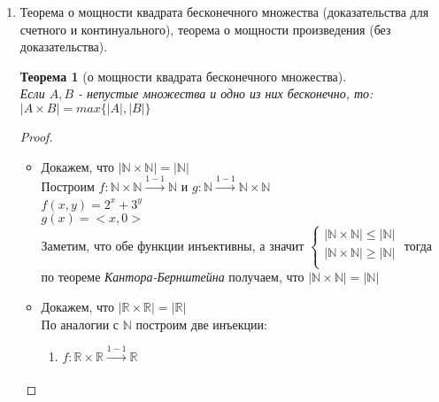 \documentclass[a4paper]{article}
\newtheorem*{theorem*}{Теорема}
\newtheorem*{lemma*}{Лемма}
\theoremstyle{definition}
\begin{document}
\begin{enumerate}
\begin{proof}
\begin{enumerate}
        \end{enumerate}
       \end{proof}
       \begin{lemma*}[о мощности объединения] Если хотя бы одно из множеств $A,B$ бесконечно, то $\left | A \cup B \right | = max\{\left | A \right |,\left | B \right |\}$.
       \end{lemma*}
 \item Теорема о мощности квадрата бесконечного множества (доказательства для счетного и континуального), теорема о мощности произведения (без доказательства).
       \begin{theorem*}[о мощности квадрата бесконечного множества]\mbox{}\\
        Если $A, B$ - непустые множества и одно из них бесконечно, то: \\$|A\times{B}| = max\{|A|, |B|\}$
       \end{theorem*}
       \begin{proof}
        \begin{itemize}
         \item Докажем, что $|\mathbb {N} \times{\mathbb{N}|} = |\mathbb {N}|$
               \\Построим $f: \mathbb{N}\times{\mathbb{N}} \xrightarrow[]{1-1}{\mathbb{N}}$ и $g: \mathbb{N}\xrightarrow[]{1-1}{\mathbb{N}\times{\mathbb{N}}}$
               \\ $f(x,y) = 2^x+3^y$
               \\ $g(x) = <x, 0>$
               \\ Заметим, что обе функции инъективны, а значит $\left\{
                \begin{matrix}
                 |\mathbb {N} \times{\mathbb{N}|} \leq |\mathbb {N}| \\
                 |\mathbb {N} \times{\mathbb{N}|} \geq |\mathbb {N}| \\
                \end{matrix}
                \right.$
               тогда по теореме \textit{Кантора-Бернштейна} получаем, что $|\mathbb {N} \times{\mathbb{N}|} = |\mathbb {N}|$
         \item Докажем, что $|\mathbb{R} \times{\mathbb{R}|} = |\mathbb{R}|$\\
               По аналогии с $\mathbb{N}$ построим две инъекции: \\
               \begin{enumerate}
                \item $f: \mathbb{R}\times{\mathbb{R}} \xrightarrow[]{1-1}{\mathbb{R}}$

\end{enumerate}
\end{itemize}
\end{proof}
\end{enumerate}
\end{document}
